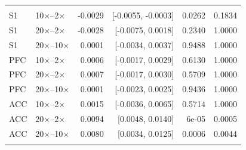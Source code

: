 \begin{longtable}{llrrrr}
\addlinespace
\multicolumn{6}{l}{\textbf{Aperiodic-adjusted power}} \\
S1 & 10$\times$--2$\times$ & -0.0029 & [-0.0055, -0.0003] & 0.0262 & 0.1834 \\
S1 & 20$\times$--2$\times$ & -0.0028 & [-0.0075, 0.0018] & 0.2340 & 1.0000 \\
S1 & 20$\times$--10$\times$ & 0.0001 & [-0.0034, 0.0037] & 0.9488 & 1.0000 \\
PFC & 10$\times$--2$\times$ & 0.0006 & [-0.0017, 0.0029] & 0.6130 & 1.0000 \\
PFC & 20$\times$--2$\times$ & 0.0007 & [-0.0017, 0.0030] & 0.5709 & 1.0000 \\
PFC & 20$\times$--10$\times$ & 0.0001 & [-0.0023, 0.0025] & 0.9436 & 1.0000 \\
ACC & 10$\times$--2$\times$ & 0.0015 & [-0.0036, 0.0065] & 0.5714 & 1.0000 \\
ACC & 20$\times$--2$\times$ & 0.0094 & [0.0048, 0.0140] & 6e-05 & 0.0005 \\
ACC & 20$\times$--10$\times$ & 0.0080 & [0.0034, 0.0125] & 0.0006 & 0.0044 \\
\addlinespace
\bottomrule
\end{longtable}
